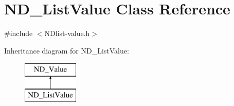 \hypertarget{class_n_d___list_value}{\section{N\-D\-\_\-\-List\-Value Class Reference}
\label{class_n_d___list_value}
}


{\ttfamily \#include $<$N\-Dlist-\/value.\-h$>$}

Inheritance diagram for N\-D\-\_\-\-List\-Value\-:\begin{figure}[H]
\begin{center}
\leavevmode
\includegraphics[height=2.000000cm]{class_n_d___list_value}
\end{center}
\end{figure}
